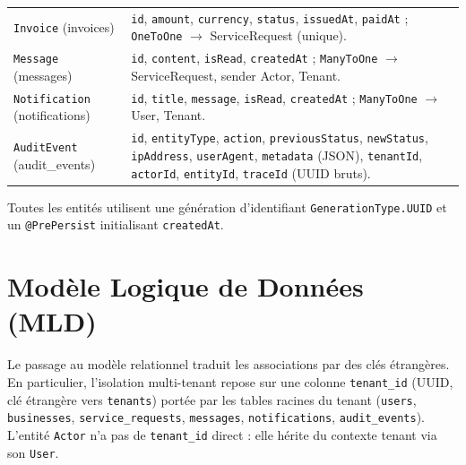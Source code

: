 \begin{table}[H]
\begin{tabularx}{\linewidth}{L{2.5cm} X}
\texttt{Invoice} (invoices) & \texttt{id}, \texttt{amount}, \texttt{currency}, \texttt{status}, \texttt{issuedAt}, \texttt{paidAt} ; \texttt{OneToOne} $\to$ ServiceRequest (unique). \\
\texttt{Message} (messages) & \texttt{id}, \texttt{content}, \texttt{isRead}, \texttt{createdAt} ; \texttt{ManyToOne} $\to$ ServiceRequest, sender Actor, Tenant. \\
\texttt{Notification} (notifications) & \texttt{id}, \texttt{title}, \texttt{message}, \texttt{isRead}, \texttt{createdAt} ; \texttt{ManyToOne} $\to$ User, Tenant. \\
\texttt{AuditEvent} (audit\_events) & \texttt{id}, \texttt{entityType}, \texttt{action}, \texttt{previousStatus}, \texttt{newStatus}, \texttt{ipAddress}, \texttt{userAgent}, \texttt{metadata} (JSON), \texttt{tenantId}, \texttt{actorId}, \texttt{entityId}, \texttt{traceId} (UUID bruts). \\
\bottomrule
\end{tabularx}
\end{table}

\noindent Toutes les entités utilisent une génération d'identifiant
\texttt{GenerationType.UUID} et un \texttt{@PrePersist} initialisant \texttt{createdAt}.

\section{Modèle Logique de Données (MLD)}

Le passage au modèle relationnel traduit les associations par des clés étrangères. En
particulier, l'isolation multi-tenant repose sur une colonne \texttt{tenant\_id} (UUID,
clé étrangère vers \texttt{tenants}) portée par les tables racines du tenant
(\texttt{users}, \texttt{businesses}, \texttt{service\_requests}, \texttt{messages},
\texttt{notifications}, \texttt{audit\_events}). L'entité \texttt{Actor} n'a pas de
\texttt{tenant\_id} direct : elle hérite du contexte tenant via son \texttt{User}.


